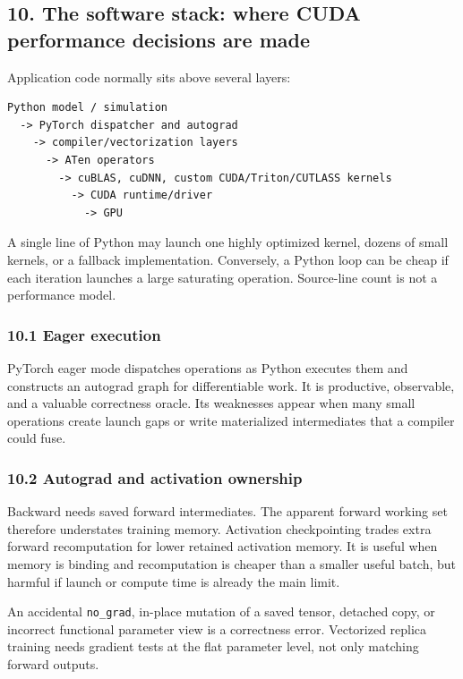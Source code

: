 \documentclass[
  10pt,
  letterpaper,
]{article}
\begin{document}
\subsection{10. The software stack: where CUDA performance decisions are
made}\label{10-the-software-stack-where-cuda-performance-decisions-are-made}

Application code normally sits above several layers:

\begin{verbatim}
Python model / simulation
  -> PyTorch dispatcher and autograd
    -> compiler/vectorization layers
      -> ATen operators
        -> cuBLAS, cuDNN, custom CUDA/Triton/CUTLASS kernels
          -> CUDA runtime/driver
            -> GPU
\end{verbatim}

A single line of Python may launch one highly optimized kernel, dozens
of small kernels, or a fallback implementation. Conversely, a Python
loop can be cheap if each iteration launches a large saturating
operation. Source-line count is not a performance model.

\subsubsection{10.1 Eager execution}\label{101-eager-execution}

PyTorch eager mode dispatches operations as Python executes them and
constructs an autograd graph for differentiable work. It is productive,
observable, and a valuable correctness oracle. Its weaknesses appear
when many small operations create launch gaps or write materialized
intermediates that a compiler could fuse.

\subsubsection{10.2 Autograd and activation
ownership}\label{102-autograd-and-activation-ownership}

Backward needs saved forward intermediates. The apparent forward working
set therefore understates training memory. Activation checkpointing
trades extra forward recomputation for lower retained activation memory.
It is useful when memory is binding and recomputation is cheaper than a
smaller useful batch, but harmful if launch or compute time is already
the main limit.

An accidental \texttt{no\_grad}, in-place mutation of a saved tensor,
detached copy, or incorrect functional parameter view is a correctness
error. Vectorized replica training needs gradient tests at the flat
parameter level, not only matching forward outputs.
\end{document}
